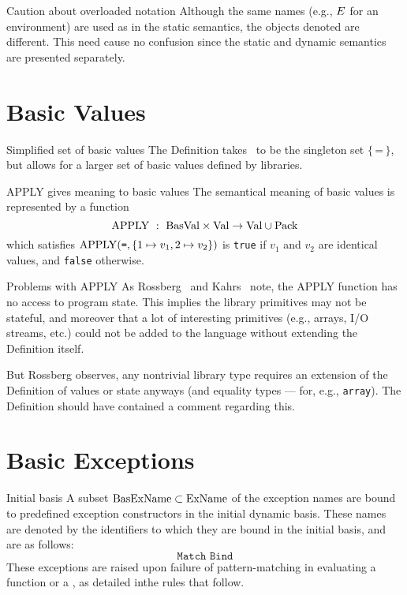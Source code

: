 \begin{remark}{Caution about overloaded notation}
Although the same names (e.g., $E$ for an environment) are used
as in the static semantics, the objects denoted are different.
This need cause no confusion since the static and dynamic semantics are
presented separately. 
\end{remark}

\section{Basic Values}

\begin{clause}{Simplified set of basic values}
The Definition takes \BasVal\ to be the singleton set
$\{\,\texttt{=}\,\}$, but allows for a larger set of basic values
defined by libraries.
\end{clause}

\begin{clause}{APPLY gives meaning to basic values}
The semantical meaning of basic values is represented by a function
\begin{equation*}
\APPLY\ :\ \BasVal\times\Val\to\Val\cup\Pack
\end{equation*}
which satisfies ${\rm APPLY}(\texttt{=},\{1\mapsto v_{1},2\mapsto v_{2}\})$
is \texttt{true} if $v_{1}$ and $v_{2}$ are identical values, and
\texttt{false} otherwise.
\end{clause}

\begin{remark}{Problems with APPLY}
As Rossberg~\cite[]{rossberg2018defects} and
Kahrs~\cite[\oldS{}--3]{kahrs1993mistakes} note, the APPLY function has no access to
program state. This implies the library primitives may not be stateful,
and moreover that a lot of interesting primitives (e.g., arrays, I/O
streams, etc.) could not be added to the language without extending the
Definition itself.

But Rossberg observes, any nontrivial library type requires an extension
of the Definition of values or state anyways (and equality types ---
for, e.g., \texttt{array}). The Definition should have contained a
comment regarding this.
\end{remark}

\section{Basic Exceptions}

\begin{clause}{Initial basis}
A subset ${\rm BasExName}\subset{\rm ExName}$ of the exception names are bound to
predefined exception constructors in the initial dynamic basis. These
names are denoted by the identifiers to which they are bound in the
initial basis, and are as follows:
\begin{equation*}
\texttt{Match\ \ Bind}
\end{equation*}
These exceptions are raised upon failure of pattern-matching in
evaluating a function or a \valbind, as detailed inthe rules that follow.
\end{clause}

